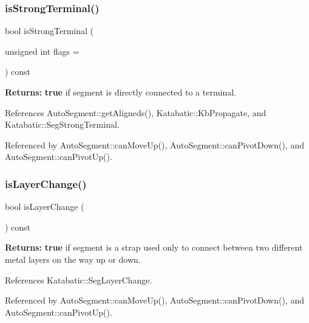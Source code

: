 \subsubsection{\texorpdfstring{is\+Strong\+Terminal()}{isStrongTerminal()}}
{\footnotesize\ttfamily bool is\+Strong\+Terminal (\begin{DoxyParamCaption}\item[{unsigned int}]{flags = {} }\end{DoxyParamCaption}) const}

{\bfseries Returns\+:} {\bfseries true} if segment is directly connected to a terminal. 

References Auto\+Segment\+::get\+Aligneds(), Katabatic\+::\+Kb\+Propagate, and Katabatic\+::\+Seg\+Strong\+Terminal.



Referenced by Auto\+Segment\+::can\+Move\+Up(), Auto\+Segment\+::can\+Pivot\+Down(), and Auto\+Segment\+::can\+Pivot\+Up().

\mbox{\label{classKatabatic_1_1AutoSegment_a772596f5d5fa897822dbd0da37024735}} 
\subsubsection{\texorpdfstring{is\+Layer\+Change()}{isLayerChange()}}
{\footnotesize\ttfamily bool is\+Layer\+Change (\begin{DoxyParamCaption}{ }\end{DoxyParamCaption}) const\hspace{0.3cm}{\ttfamily [inline]}}

{\bfseries Returns\+:} {\bfseries true} if segment is a strap used only to connect between two different metal layers on the way up or down. 

References Katabatic\+::\+Seg\+Layer\+Change.



Referenced by Auto\+Segment\+::can\+Move\+Up(), Auto\+Segment\+::can\+Pivot\+Down(), and Auto\+Segment\+::can\+Pivot\+Up().

\mbox{\label{classKatabatic_1_1AutoSegment_a3776b8258ab6544c9551d0714fcc75d2}} 
